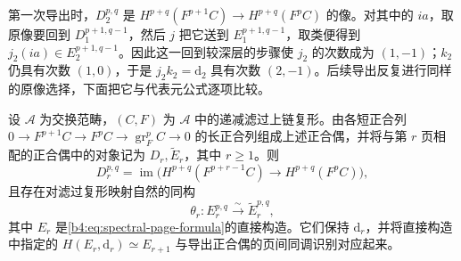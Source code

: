 \ProseParagraphBreak
第一次导出时，\(D_2^{p,q}\) 是 \(H^{p+q}(F^{p+1}C)\to H^{p+q}(F^pC)\) 的像。对其中的 \(ia\)，取原像要回到 \(D_1^{p+1,q-1}\)，然后 \(j\) 把它送到 \(E_1^{p+1,q-1}\)，取类便得到 \(j_2(ia)\in E_2^{p+1,q-1}\)。因此这一回到较深层的步骤使 \(j_2\) 的次数成为 \((1,-1)\)；\(k_2\) 仍具有次数 \((1,0)\)，于是 \(j_2k_2=\mathrm{d}_2\) 具有次数 \((2,-1)\)。后续导出反复进行同样的原像选择，下面把它与代表元公式逐项比较。

\begin{proposition}\label{b4:prop:filtered-exact-couple-comparison}
	设 \(\mathcal A\) 为交换范畴，\((C,F)\) 为 \(\mathcal A\) 中的递减滤过上链复形。由各短正合列 \(0\to F^{p+1}C\to F^pC\to\operatorname{gr}_F^pC\to0\) 的长正合列组成上述正合偶，并将与第 \(r\) 页相配的正合偶中的对象记为 \(D_r,\widetilde E_r\)，其中 \(r\ge1\)。则
	\[
		D_r^{p,q}= \operatorname{im}\bigl(H^{p+q}(F^{p+r-1}C) \longrightarrow H^{p+q}(F^pC)\bigr),
	\]
	且存在对滤过复形映射自然的同构
	\[
		\theta_r:E_r^{p,q}\xrightarrow{\ \sim\ }\widetilde E_r^{p,q},
	\]
	其中 \(E_r\) 是\cref{b4:eq:spectral-page-formula}的直接构造。它们保持 \(\mathrm{d}_r\)，并将直接构造中指定的 \(H(E_r,\mathrm{d}_r)\simeq E_{r+1}\) 与导出正合偶的页间同调识别对应起来。
\end{proposition}
